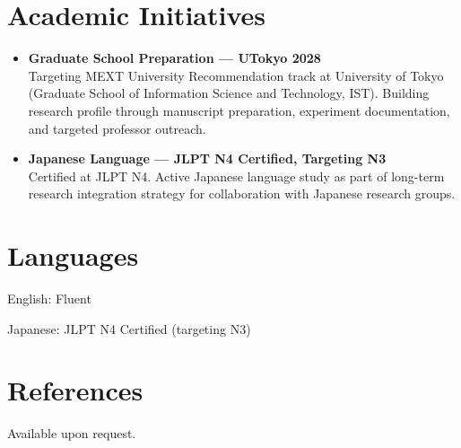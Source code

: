 \documentclass[letterpaper,11pt]{article}
\newcommand{\resumeSubHeadingListStart}{\begin{itemize}[leftmargin=0in, label={}]}
\newcommand{\resumeSubHeadingListEnd}{\end{itemize}}
\newcommand{\resumeSubItem}[2]{
  \item
  \textbf{#1} \\
  {\small #2}
}
\begin{document}

\section{Academic Initiatives}
\resumeSubHeadingListStart

\resumeSubItem
{Graduate School Preparation --- UTokyo 2028}
{Targeting MEXT University Recommendation track at University of Tokyo (Graduate School of Information Science and Technology, IST). Building research profile through manuscript preparation, experiment documentation, and targeted professor outreach.}

\vspace{4pt}

\resumeSubItem
{Japanese Language --- JLPT N4 Certified, Targeting N3}
{Certified at JLPT N4. Active Japanese language study as part of long-term research integration strategy for collaboration with Japanese research groups.}

\resumeSubHeadingListEnd


\section{Languages}
\begin{description}[font=$\bullet$]
\item {English: Fluent}
\vspace{-4pt}
\item {Japanese: JLPT N4 Certified (targeting N3)}
\end{description}


\section{References}
Available upon request.
\end{document}
